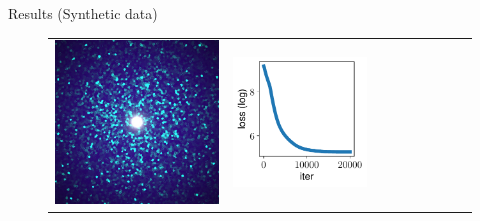 \documentclass[final]{beamer}
\newlength{\twocolwid}
\newlength{\resultwidth}
\begin{document}
\begin{frame}[t]
\begin{columns}[t]
\begin{column}{\twocolwid}
\begin{block}{Results (Synthetic data)}
\begin{figure}[t]
\begin{tabular}{ccrclcccc}
            		\includegraphics[width=\resultwidth]{synth/flake/target.jpg} &
            		\includegraphics[width=\resultwidth]{synth/flake/loss.pdf} &

\end{tabular}
\end{figure}
\end{block}
\end{column}
\end{columns}
\end{frame}
\end{document}
